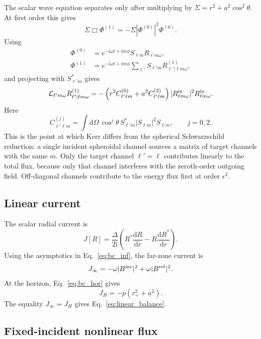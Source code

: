 \documentclass[aps,prd,twocolumn,10pt,nofootinbib,superscriptaddress,floatfix]{revtex4-2}
\newcommand{\dd}{\mathrm{d}}
\newcommand{\ii}{\mathrm{i}}
\newcommand{\rp}{r_+}
\newcommand{\Bin}{B^{\rm inc}}
\newcommand{\Bref}{B^{\rm ref}}
\newcommand{\DeltaK}{\Delta}
\begin{document}
The scalar wave equation separates only after multiplying by
$\Sigma=r^2+a^2\cos^2\theta$.  At first order this gives
\begin{equation}
\Sigma\Box\Phi^{(1)}=-\Sigma|\Phi^{(0)}|^2\Phi^{(0)} .
\end{equation}
Using
\begin{align}
\Phi^{(0)}
&=e^{-\ii\omega t+\ii m\phi}S_{\ell m}R_{\ell m\omega},
\nonumber\\
\Phi^{(1)}
&=e^{-\ii\omega t+\ii m\phi}
\sum_{\ell'}S_{\ell'm}R^{(1)}_{\ell'|\ell m\omega},
\end{align}
and projecting with $S_{\ell'm}^*$ gives
\begin{equation}
\mathcal L_{\ell'm\omega}R^{(1)}_{\ell'|\ell m\omega}
=-\left(r^2C^{(0)}_{\ell'\ell m}
+a^2C^{(2)}_{\ell'\ell m}\right)
|R_{\ell m\omega}^{\rm in}|^2R_{\ell m\omega}^{\rm in}.
\end{equation}
Here
\begin{equation}
C^{(j)}_{\ell'\ell m}=
\int \dd\Omega\,\cos^j\theta\,
S_{\ell'm}^*|S_{\ell m}|^2S_{\ell m},
\qquad j=0,2 .
\end{equation}
This is the point at which Kerr differs from the spherical Schwarzschild
reduction: a single incident spheroidal channel sources a matrix of target
channels with the same $m$.  Only the target channel $\ell'=\ell$ contributes
linearly to the total flux, because only that channel interferes with the
zeroth-order outgoing field.  Off-diagonal channels contribute to the energy
flux first at order $\epsilon^2$.

\subsection{Linear current}

The scalar radial current is
\begin{equation}
J[R]=\frac{\DeltaK}{2\ii}
\left(R^*\frac{\dd R}{\dd r}-R\frac{\dd R^*}{\dd r}\right).
\end{equation}
Using the asymptotics in Eq.~\eqref{eq:bc_inf}, the far-zone current is
\begin{equation}
J_\infty=-\omega|\Bin|^2+\omega|\Bref|^2 .
\end{equation}
At the horizon, Eq.~\eqref{eq:bc_hor} gives
\begin{equation}
J_H=-p(\rp^2+a^2).
\end{equation}
The equality $J_\infty=J_H$ gives
Eq.~\eqref{eq:linear_balance}.

\subsection{Fixed-incident nonlinear flux}
\end{document}
